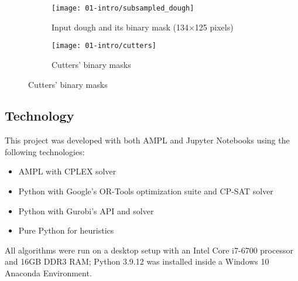 \begin{figure}[p]
	\begin{subfigure}{\textwidth}
		\centering	
		\texttt{[image: 01-intro/subsampled\_dough]}
		\caption{Input dough and its binary mask (134×125 pixels)}
		\label{fig:input_dough}
	\end{subfigure}
	
	\begin{subfigure}{\textwidth}
		\centering	
		\texttt{[image: 01-intro/cutters]}
		\caption{Cutters' binary masks}
		\label{fig:cutters}
	\end{subfigure}
\end{figure}

\newpage

\subsection{Technology}
This project was developed with both AMPL and Jupyter Notebooks using the following technologies:
\begin{itemize}[itemsep=-1mm, topsep=0mm]
	\item AMPL with CPLEX solver
	\item Python with Google's OR-Tools optimization suite and CP-SAT solver
	\item Python with Gurobi's API and solver
	\item Pure Python for heuristics
\end{itemize}

All algorithms were run on a desktop setup with an Intel Core i7-6700 processor and 16GB DDR3 RAM; Python 3.9.12 was installed inside a Windows 10 Anaconda Environment.
